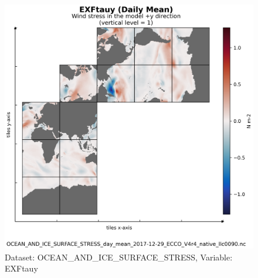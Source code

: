 
\begin{figure}[H]
\centering
\includegraphics[scale=0.55]{../images/plots/v4r4/native_plots/Ocean_and_Sea-Ice_Surface_Stress/EXFtauy.png}
\caption{Dataset: OCEAN\_AND\_ICE\_SURFACE\_STRESS, Variable: EXFtauy}
\label{tab:table-OCEAN_AND_ICE_SURFACE_STRESS_EXFtauy-Plot}
\end{figure}
\newpage
\pagebreak
